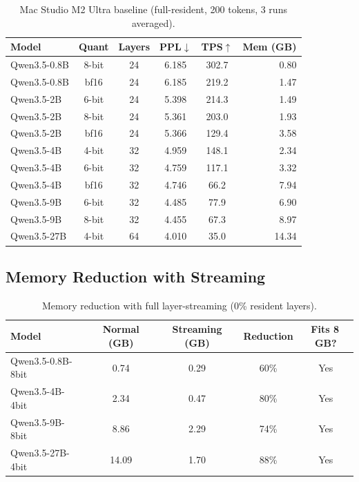 \documentclass[10pt,a4paper]{article}
\begin{document}
\begin{table}[ht!]
\centering\small
\caption{Mac Studio M2 Ultra baseline (full-resident, 200 tokens, 3 runs averaged).}
\label{tab:baseline}
\begin{tabular}{lccccr}
\toprule
\textbf{Model} & \textbf{Quant} & \textbf{Layers} & \textbf{PPL}$\downarrow$ & \textbf{TPS}$\uparrow$ & \textbf{Mem (GB)} \\
\midrule
Qwen3.5-0.8B & 8-bit  & 24 & 6.185 & 302.7 & 0.80 \\
Qwen3.5-0.8B & bf16   & 24 & 6.185 & 219.2 & 1.47 \\
Qwen3.5-2B   & 6-bit  & 24 & 5.398 & 214.3 & 1.49 \\
Qwen3.5-2B   & 8-bit  & 24 & 5.361 & 203.0 & 1.93 \\
Qwen3.5-2B   & bf16   & 24 & 5.366 & 129.4 & 3.58 \\
Qwen3.5-4B   & 4-bit  & 32 & 4.959 & 148.1 & 2.34 \\
Qwen3.5-4B   & 6-bit  & 32 & 4.759 & 117.1 & 3.32 \\
Qwen3.5-4B   & bf16   & 32 & 4.746 &  66.2 & 7.94 \\
Qwen3.5-9B   & 6-bit  & 32 & 4.485 &  77.9 & 6.90 \\
Qwen3.5-9B   & 8-bit  & 32 & 4.455 &  67.3 & 8.97 \\
Qwen3.5-27B  & 4-bit  & 64 & 4.010 &  35.0 & 14.34 \\
\bottomrule
\end{tabular}
\end{table}

\subsection{Memory Reduction with Streaming}

\begin{table}[ht!]
\centering\small
\caption{Memory reduction with full layer-streaming (0\% resident layers).}
\label{tab:memory}
\begin{tabular}{lcccc}
\toprule
\textbf{Model} & \textbf{Normal (GB)} & \textbf{Streaming (GB)} & \textbf{Reduction} & \textbf{Fits 8\,GB?} \\
\midrule
Qwen3.5-0.8B-8bit &  0.74 & 0.29 & 60\% & Yes \\
Qwen3.5-4B-4bit   &  2.34 & 0.47 & 80\% & Yes \\
Qwen3.5-9B-8bit   &  8.86 & 2.29 & 74\% & Yes \\
Qwen3.5-27B-4bit  & 14.09 & 1.70 & 88\% & Yes \\
\bottomrule
\end{tabular}
\end{table}
\end{document}
